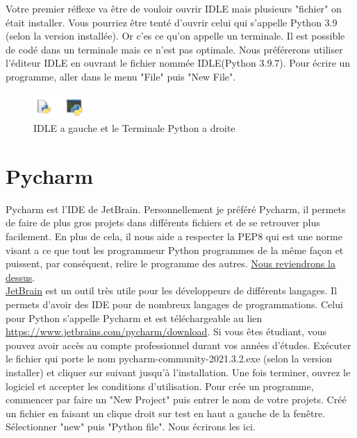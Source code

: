Votre premier réflexe va être de vouloir ouvrir IDLE mais plusieurs "fichier" on était installer. Vous pourriez être tenté d'ouvrir celui qui s'appelle Python 3.9 (selon la version installée). Or c'es ce qu'on appelle un terminale. Il est possible de codé dans un terminale mais ce n'est pas optimale. Nous préférerons utiliser l'éditeur IDLE en ouvrant le fichier nommée IDLE(Python 3.9.7). Pour écrire un programme, aller dans le menu "File" puis "New File".

\begin{figure}[H]
\includegraphics[scale=1]{IDLE-et-TERM}
\caption{IDLE a gauche et le Terminale Python a droite}
\end{figure}

\section*{Pycharm}
Pycharm est l'IDE de JetBrain. Personnellement je préféré Pycharm, il permets de faire de plus gros projets dans différents fichiers et de se retrouver plus facilement. En plus de cela, il nous aide a respecter la PEP8 qui est une norme visant a ce que tout les programmeur Python programmes de la même façon et puissent, par conséquent, relire le programme des autres.  \hyperref[sec:PEP8]{Nous reviendrons la dessus}.\\

\href{https://www.jetbrains.com/}{JetBrain} est un outil très utile pour les développeurs de différents langages. Il permets d'avoir des IDE pour de nombreux langages de programmations. Celui pour Python s'appelle Pycharm et est téléchargeable au lien \url{https://www.jetbrains.com/pycharm/download}. Si vous êtes étudiant, vous pouvez avoir accès au compte professionnel durant vos années d'études. Exécuter le fichier qui porte le nom pycharm-community-2021.3.2.exe (selon la version installer) et cliquer sur suivant jusqu'à l'installation. Une fois terminer, ouvrez le logiciel et accepter les conditions d'utilisation. Pour crée un programme, commencer par faire un "New Project" puis entrer le nom de votre projets. Créé un fichier en faisant un clique droit sur test en haut a gauche de la fenêtre. Sélectionner "new" puis "Python file". Nous écrirons les ici.

